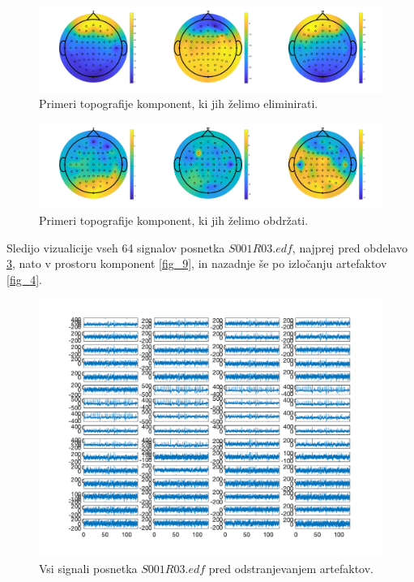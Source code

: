 \documentclass[9pt]{IEEEtran}
\begin{document}
\begin{figure}[!htb]
\centering
\includegraphics[width=1\columnwidth]{sigs_to_eliminate.png}
\caption[c1]{ Primeri topografije  komponent, ki jih želimo eliminirati.  }
\label{fig_7}
\end{figure}

\begin{figure}[!htb]
\centering
\includegraphics[width=1\columnwidth]{sigs_to_keep.png}
\caption[c1]{ Primeri topografije komponent, ki jih želimo obdržati. }
\label{fig_8}
\end{figure}

Sledijo vizualicije vseh 64 signalov posnetka $S001R03.edf$, najprej pred obdelavo \ref{fig_3}, nato v prostoru komponent \ref{fig_9}, in nazadnje še po izločanju artefaktov \ref{fig_4}.

\begin{figure}[!htb]
\centering
\includegraphics[width=1\columnwidth]{insig_all.png}
\caption[c1]{ Vsi signali posnetka $S001R03.edf$ pred odstranjevanjem artefaktov. }
\label{fig_3}
\end{figure}
\end{document}
